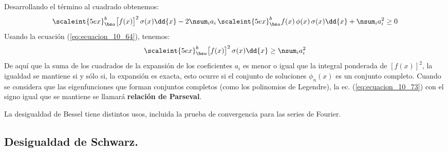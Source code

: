 Desarrollando el término al cuadrado obtenemos:
\begin{equation}
\scaleint{5ex}_{\bs a}^{b} \big[ f (x) \big]^{2} \, \sigma (x) \dd{x} - 2 \nsum_{i} a_{i} \, \scaleint{5ex}_{\bs a}^{b} f (x) \, \phi (x) \, \sigma (x) \dd{x} + \nsum_{i} a_{i}^{2} \geq 0
\label{eq:ecuacion_10_72}
\end{equation}
Usando la ecuación (\ref{eq:ecuacion_10_64}), tenemos:
\begin{equation}
\scaleint{5ex}_{\bs a}^{b} \big[ f (x) \big]^{2} \, \sigma (x) \dd{x} \geq \nsum_{i} a_{i}^{2}
\label{eq:ecuacion_10_73}
\end{equation}
De aquí que la suma de los cuadrados de la expansión de los coeficientes $a_{i}$ es menor o igual que la integral ponderada de $[f (x)]^{2}$, la igualdad se mantiene si y sólo si, la expansión es exacta, esto ocurre si el conjunto de soluciones $\phi_{n} (x)$ es un conjunto completo. Cuando se considera que las eigenfunciones que forman conjuntos completos (como los polinomios de Legendre), la ec. (\ref{eq:ecuacion_10_73}) con el signo igual que se mantiene se llamará \textbf{relación de Parseval}.
\par
La desigualdad de Bessel tiene distintos usos, incluida la prueba de convergencia para las series de Fourier.

\subsection{Desigualdad de Schwarz.}

